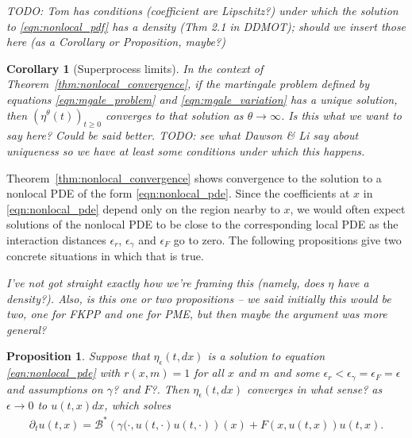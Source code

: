 \documentclass[12pt]{article}
\newtheorem{proposition}[theorem]{Proposition}
\newtheorem{corollary}[theorem]{Corollary}
\newcommand{\DG}{\mathcal{B}}  %
\newcommand{\comment}[1]{{\color{blue} \it #1}}
\begin{document}
\comment{TODO: Tom has conditions (coefficient are Lipschitz?) under which
    the solution to \eqref{eqn:nonlocal_pdf} has a density (Thm 2.1 in DDMOT);
    should we insert those here (as a Corollary or Proposition, maybe?)}

\begin{corollary}[Superprocess limits] \label{cor:superprocess_uniqueness}
    In the context of Theorem~\ref{thm:nonlocal_convergence},
    if the martingale problem
    defined by equations \eqref{eqn:mgale_problem} and \eqref{eqn:mgale_variation}
    has a unique solution,
    then $(\eta^\theta(t))_{t \ge 0}$ converges to that solution
    as $\theta \to \infty$.
    \comment{
        Is this what we want to say here? Could be said better.
        TODO: see what Dawson \& Li say about uniqueness
        so we have at least some conditions under which this happens.
    }
\end{corollary}

Theorem~\ref{thm:nonlocal_convergence} shows convergence to the solution to a nonlocal PDE
of the form \eqref{eqn:nonlocal_pde}.
Since the coefficients at $x$ in \eqref{eqn:nonlocal_pde}
depend only on the region nearby to $x$,
we would often expect solutions of the nonlocal PDE to be close to the corresponding local PDE
as the interaction distances $\epsilon_r$, $\epsilon_\gamma$ and $\epsilon_F$
go to zero.
The following propositions give two concrete situations in which that is true.

\comment{I've not got straight exactly how we're framing this
    (namely, does $\eta$ have a density?).
    Also, is this one or two propositions --
    we said initially this would be two,
    one for FKPP and one for PME,
    but then maybe the argument was more general?
}

\begin{proposition}
    \label{prop:nonlocal_to_local}
    Suppose that $\eta_\epsilon(t,dx)$ is a solution to equation \eqref{eqn:nonlocal_pde}
    with $r(x, m) = 1$ for all $x$ and $m$
    and some $\epsilon_r < \epsilon_\gamma = \epsilon_F = \epsilon$
    \comment{and assumptions on $\gamma$? and $F$?}.
    Then $\eta_\epsilon(t, dx)$ converges \comment{in what sense?} as $\epsilon \to 0$
    to $u(t, x) dx$, which solves
    \begin{align} \label{eqn:PDE}
        \partial_t u(t, x)
        =
        \DG^* \left( \gamma(\cdot, u(t, \cdot) u(t, \cdot)  \right)(x)
        + F(x, u(t, x)) u(t, x) .
    \end{align}
\end{proposition}
\end{document}
